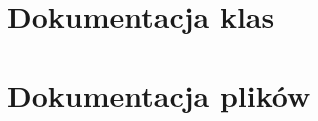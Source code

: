 \documentclass[twoside]{book}
\newcommand{\+}{\discretionary{\mbox{\scriptsize$\hookleftarrow$}}{}{}}
\newcommand{\clearemptydoublepage}{%
    \newpage{\pagestyle{empty}\cleardoublepage}%
  }
\begin{document}
\chapter{Dokumentacja klas}



\chapter{Dokumentacja plików}










  \backmatter
  \newpage
  \clearemptydoublepage
  \printindex
\end{document}
